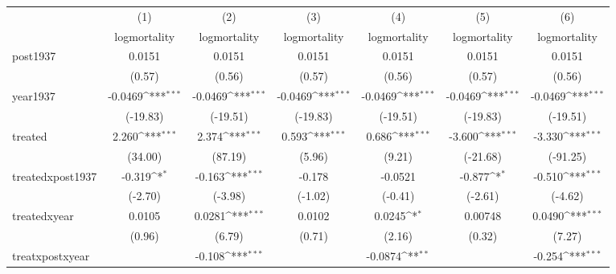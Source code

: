 {
\def\sym#1{\ifmmode^{#1}\else\(^{#1}\)\fi}
\begin{tabular}{l*{6}{c}}
\hline\hline
            &\multicolumn{1}{c}{(1)}&\multicolumn{1}{c}{(2)}&\multicolumn{1}{c}{(3)}&\multicolumn{1}{c}{(4)}&\multicolumn{1}{c}{(5)}&\multicolumn{1}{c}{(6)}\\
            &\multicolumn{1}{c}{logmortality}&\multicolumn{1}{c}{logmortality}&\multicolumn{1}{c}{logmortality}&\multicolumn{1}{c}{logmortality}&\multicolumn{1}{c}{logmortality}&\multicolumn{1}{c}{logmortality}\\
\hline
post1937    &      0.0151         &      0.0151         &      0.0151         &      0.0151         &      0.0151         &      0.0151         \\
            &      (0.57)         &      (0.56)         &      (0.57)         &      (0.56)         &      (0.57)         &      (0.56)         \\
[1em]
year1937    &     -0.0469\sym{***}&     -0.0469\sym{***}&     -0.0469\sym{***}&     -0.0469\sym{***}&     -0.0469\sym{***}&     -0.0469\sym{***}\\
            &    (-19.83)         &    (-19.51)         &    (-19.83)         &    (-19.51)         &    (-19.83)         &    (-19.51)         \\
[1em]
treated     &       2.260\sym{***}&       2.374\sym{***}&       0.593\sym{***}&       0.686\sym{***}&      -3.600\sym{***}&      -3.330\sym{***}\\
            &     (34.00)         &     (87.19)         &      (5.96)         &      (9.21)         &    (-21.68)         &    (-91.25)         \\
[1em]
treatedxpost1937&      -0.319\sym{*}  &      -0.163\sym{***}&      -0.178         &     -0.0521         &      -0.877\sym{*}  &      -0.510\sym{***}\\
            &     (-2.70)         &     (-3.98)         &     (-1.02)         &     (-0.41)         &     (-2.61)         &     (-4.62)         \\
[1em]
treatedxyear&      0.0105         &      0.0281\sym{***}&      0.0102         &      0.0245\sym{*}  &     0.00748         &      0.0490\sym{***}\\
            &      (0.96)         &      (6.79)         &      (0.71)         &      (2.16)         &      (0.32)         &      (7.27)         \\
[1em]
treatxpostxyear&                     &      -0.108\sym{***}&                     &     -0.0874\sym{**} &                     &      -0.254\sym{***}\\

\end{tabular}}
